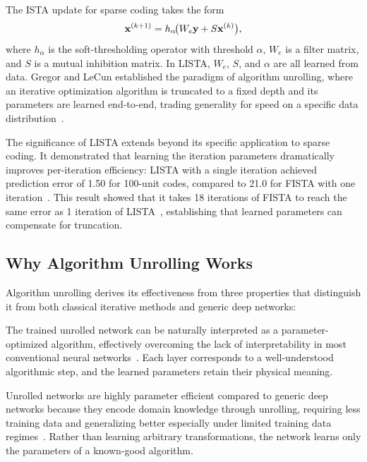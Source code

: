 The ISTA update for sparse coding takes the form
\begin{equation}
    \mathbf{x}^{(k+1)} = h_{\alpha}\!\big(W_e \mathbf{y} + S \mathbf{x}^{(k)}\big),
    \label{eq:ista_update}
\end{equation}
where $h_\alpha$ is the soft-thresholding operator with threshold $\alpha$, $W_e$ is a filter matrix, and $S$ is a mutual inhibition matrix. In LISTA, $W_e$, $S$, and $\alpha$ are all learned from data. Gregor and LeCun established the paradigm of algorithm unrolling, where an iterative optimization algorithm is truncated to a fixed depth and its parameters are learned end-to-end, trading generality for speed on a specific data distribution~\cite{gregor2010lista}.

The significance of LISTA extends beyond its specific application to sparse coding. It demonstrated that learning the iteration parameters dramatically improves per-iteration efficiency: LISTA with a single iteration achieved prediction error of 1.50 for 100-unit codes, compared to 21.0 for FISTA with one iteration~\cite{gregor2010lista}. This result showed that it takes 18 iterations of FISTA to reach the same error as 1 iteration of LISTA~\cite{gregor2010lista}, establishing that learned parameters can compensate for truncation.

\subsection{Why Algorithm Unrolling Works}

Algorithm unrolling derives its effectiveness from three properties that distinguish it from both classical iterative methods and generic deep networks:

 The trained unrolled network can be naturally interpreted as a parameter-optimized algorithm, effectively overcoming the lack of interpretability in most conventional neural networks~\cite{monga2021unrolling}. Each layer corresponds to a well-understood algorithmic step, and the learned parameters retain their physical meaning.

 Unrolled networks are highly parameter efficient compared to generic deep networks because they encode domain knowledge through unrolling, requiring less training data and generalizing better especially under limited training data regimes~\cite{monga2021unrolling}. Rather than learning arbitrary transformations, the network learns only the parameters of a known-good algorithm.

